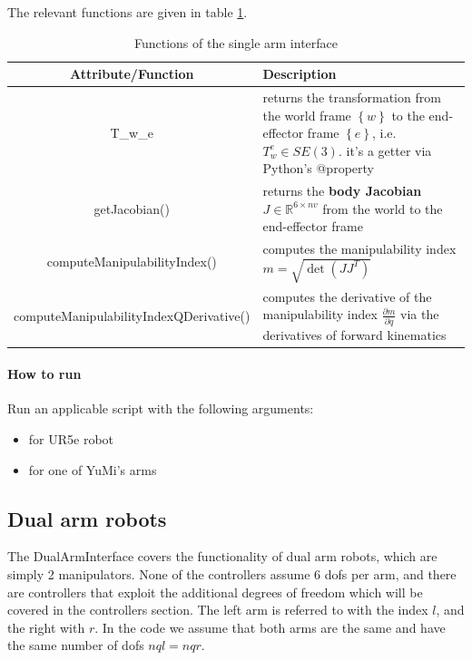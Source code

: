The relevant functions are given in table \ref{table-single-arm-interface}.

\begin{table}[h!]
		\centering
		\label{table-single-arm-interface}
		\begin{tabular}{c|p{7cm}}
\textbf{Attribute/Function} & \textbf{Description}\\
\hline 
T\_w\_e & returns the transformation from the world
frame $ \left\{ w \right\}   $ to the end-effector frame 
$ \left\{ e \right\}   $, i.e.$ T_{ w }^{ e } \in SE (3) $. it's a getter via Python's @property\\
\hline 
getJacobian() & returns the \textbf{body Jacobian} $ J \in \mathbb{R}^{6 \times nv}  $
from the world to the end-effector frame \\
\hline 
computeManipulabilityIndex() & computes the manipulability index
$ m = \sqrt{\det (J J^{ T })}  $ \\
\hline 
computeManipulabilityIndexQDerivative() & computes the derivative of the manipulability index
$ \frac{\partial m}{\partial q}   $ via the derivatives of forward kinematics\\
		\end{tabular}
		\caption{Functions of the single arm interface}
\end{table}


\paragraph{How to run}
Run an applicable script with the following arguments:
\begin{itemize}
		\item for UR5e robot 
		\item for one of YuMi's arms 
\end{itemize}

\subsection{Dual arm robots}
The DualArmInterface covers the functionality of dual arm robots,
which are simply 2 manipulators.
None of the controllers assume 6 dofs per arm,
and there are controllers that exploit the additional degrees of freedom
which will be covered in the controllers section.
The left arm is referred to with the index $ l  $, and the right with $ r  $.
In the code we assume that both arms are the same and have
the same number of dofs $ nql = nqr  $.

